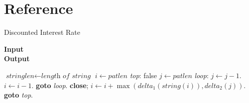 \chapter{Reference}\label{sec:something}

    \begin{algorithm}
    \caption{Discounted Interest Rate}\label{euclid}
    \hspace*{\algorithmicindent} \textbf{Input} \\
    \hspace*{\algorithmicindent} \textbf{Output} 
    \begin{algorithmic}[1]
    \State $\textit{stringlen} \gets \textit{length of } \textit{string}$
    \State $i \gets \textit{patlen}$
    \BState \emph{top}:
     \Return false
    \EndIf
    \State $j \gets \textit{patlen}$
    \BState \emph{loop}:
    \State $j \gets j-1$.
    \State $i \gets i-1$.
    \State \textbf{goto} \emph{loop}.
    \State \textbf{close};
    \EndIf
    \State $i \gets i+\max(\textit{delta}_1(\textit{string}(i)),\textit{delta}_2(j))$.
    \State \textbf{goto} \emph{top}.
    \EndProcedure
    \end{algorithmic}
    \end{algorithm}

 \cleardoublepage

